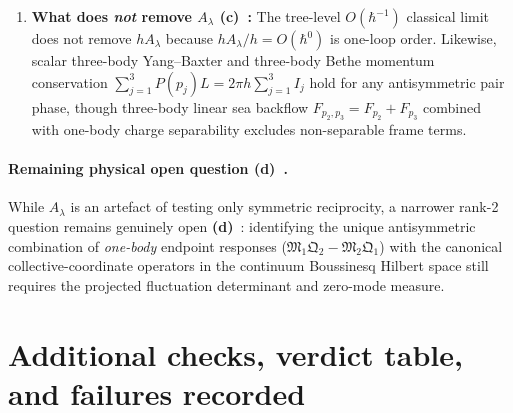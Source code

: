 \documentclass[11pt,a4paper]{article}
\newcommand{\Lc}{\textsf{\textbf{(c)}}\ }
\newcommand{\Ld}{\textsf{\textbf{(d)}}\ }
\begin{document}
\begin{enumerate}
is \emph{even} under $r\mapsto -r$ ($\beta_2\mapsto -\beta_2$), whereas the physical
one-loop residual $R_0(\infty,r)=-\frac{4}{\pi}(\chi_2(r)-r)$ is strictly \emph{odd}
in $r$. Furthermore, $A_\lambda(Y,r^2Y)$ introduces unphysical third-order poles at
$r=\pm i$ ($\beta_1^2+\beta_2^2=0$), where the Toda Bethe kernel is regular.
\item \textbf{What does \emph{not} remove $A_\lambda$ \Lc:}
The tree-level $O(\hbar^{-1})$ classical limit does not remove $hA_\lambda$ because
$hA_\lambda/h=O(\hbar^0)$ is one-loop order. Likewise, scalar three-body Yang--Baxter
and three-body Bethe momentum conservation $\sum_{j=1}^3 P(p_j)L=2\pi h\sum_{j=1}^3 I_j$
hold for any antisymmetric pair phase, though three-body linear sea backflow
$F_{p_2,p_3}=F_{p_2}+F_{p_3}$ combined with one-body charge separability excludes
non-separable frame terms.
\end{enumerate}

\paragraph{Remaining physical open question \Ld.}
While $A_\lambda$ is an artefact of testing only symmetric reciprocity, a narrower
rank-2 question remains genuinely open \Ld: identifying the unique antisymmetric combination
of \emph{one-body} endpoint responses ($\mathfrak M_1\mathfrak Q_2-\mathfrak M_2\mathfrak Q_1$)
with the canonical collective-coordinate operators in the continuum Boussinesq Hilbert
space still requires the projected fluctuation determinant and zero-mode measure.

\section{Additional checks, verdict table, and failures recorded}
\end{document}
